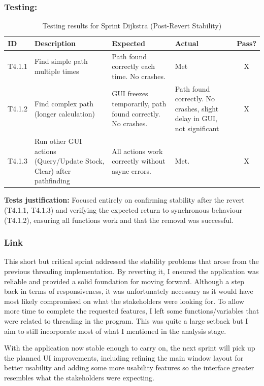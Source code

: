 \subsubsection{Testing:}
\begin{table}[htbp]
	\centering
	\begin{tabularx}{\textwidth}{|l|X|p{3.5cm}|p{3.5cm}|c|}
		\hline
		\textbf{ID} & \textbf{Description} & \textbf{Expected} & \textbf{Actual} & \textbf{Pass?} \\
		\hline
		T4.1.1 & Find simple path multiple times & Path found correctly each time. No crashes. & Met & X \\
		\hline
		T4.1.2 & Find complex path (longer calculation) & GUI freezes temporarily, path found correctly. No crashes. & Path found correctly. No crashes, slight delay in GUI, not significant & X \\
		\hline
		T4.1.3 & Run other GUI actions (Query/Update Stock, Clear) after pathfinding & All actions work correctly without async errors. & Met. & X \\
		\hline
	\end{tabularx}
	\caption{Testing results for Sprint Dijkstra (Post-Revert Stability)}
\end{table}
\textbf{Tests justification:} Focused entirely on confirming stability after the revert (T4.1.1, T4.1.3) and verifying the expected return to synchronous behaviour (T4.1.2), ensuring all functions work and that the removal was successful.

\subsubsection{Link}
This short but critical sprint addressed the stability problems that arose from the previous threading implementation. By reverting it, I ensured the application was reliable and provided a solid foundation for moving forward. Although a step back in terms of responsiveness, it was unfortunately necessary as it would have most likely compromised on what the stakeholders were looking for. To allow more time to complete the requested features, I left some functions/variables that were related to threading in the program. This was quite a large setback but I aim to still incorporate most of what I mentioned in the analysis stage.

With the application now stable enough to carry on, the next sprint will pick up the planned UI improvements, including refining the main window layout for better usability and adding some more usability features so the interface greater resembles what the stakeholders were expecting.

